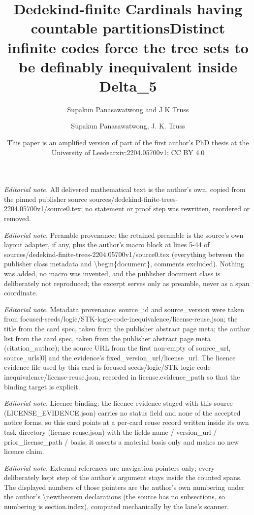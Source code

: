 \documentclass[10pt,a4paper]{amsart}
\title{Dedekind-finite Cardinals having countable partitions}
\author{Supakun Panasawatwong and J K Truss}
\date{This paper is an amplified version of part of the first author's PhD thesis at the University of Leeds}%
\title{Distinct infinite codes force the tree sets to be definably inequivalent inside Delta\_5}
\author{Supakun Panasawatwong, J. K. Truss}
\date{arxiv:2204.05700v1; CC BY 4.0}
\begin{document}
\maketitle
\noindent\textit{Editorial note.} All delivered mathematical text is the author's own, copied from the pinned publisher source sources/dedekind-finite-trees-2204.05700v1/source0.tex; no statement or proof step was rewritten, reordered or removed.\par\medskip
\noindent\textit{Editorial note.} Preamble provenance: the retained preamble is the source's own layout adapter, if any, plus the author's macro block at lines 5-44 of sources/dedekind-finite-trees-2204.05700v1/source0.tex (everything between the publisher class metadata and \textbackslash{}begin\{document\}, comments excluded). Nothing was added, no macro was invented, and the publisher document class is deliberately not reproduced; the excerpt serves only as preamble, never as a span coordinate.\par\medskip
\noindent\textit{Editorial note.} Metadata provenance: source\_id and source\_version were taken from focused-seeds/logic/STK-logic-code-inequivalence/license-reuse.json; the title from the card spec, taken from the publisher abstract page meta; the author list from the card spec, taken from the publisher abstract page meta (citation\_author); the source URL from the first non-empty of source\_url, source\_urls[0] and the evidence's fixed\_version\_url/license\_url. The licence evidence file used by this card is focused-seeds/logic/STK-logic-code-inequivalence/license-reuse.json, recorded in license.evidence\_path so that the binding target is explicit.\par\medskip
\noindent\textit{Editorial note.} Licence binding: the licence evidence staged with this source (LICENSE\_EVIDENCE.json) carries no status field and none of the accepted notice forms, so this card points at a per-card reuse record written inside its own task directory (license-reuse.json) with the fields name / version\_url / prior\_license\_path / basis; it asserts a material basis only and makes no new licence claim.\par\medskip
\noindent\textit{Editorial note.} External references are navigation pointers only; every deliberately kept step of the author's argument stays inside the counted spans. The displayed numbers of those pointers are the author's own numbering under the author's \textbackslash{}newtheorem declarations (the source has no subsections, so numbering is section.index), computed mechanically by the lane's scanner.\par\medskip
\end{document}
